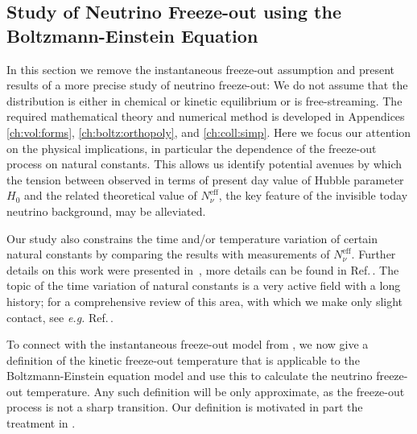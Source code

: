 \subsection{Study of Neutrino Freeze-out using the Boltzmann-Einstein Equation}\label{ch:param:studies}
In this section we remove the instantaneous freeze-out assumption and present results of a more precise study of neutrino freeze-out: We do not assume that the distribution is either in chemical or kinetic equilibrium or is free-streaming. The required mathematical theory and numerical method is developed in Appendices \ref{ch:vol:forms}, \ref{ch:boltz:orthopoly}, and \ref{ch:coll:simp}. Here we focus our attention on the physical implications, in particular the dependence of the freeze-out process on natural constants. This allows us identify potential avenues by which the tension between observed in terms of present day value of Hubble parameter $H_0$ and the related theoretical value of $N^{\mathrm{eff}}_\nu$, the key feature of the invisible today neutrino background, may be alleviated. 

Our study also constrains the time and/or temperature variation of certain natural constants by comparing the results with measurements of $N_\nu^{\mathrm{eff}}$. Further details on this work were presented in~,  more details can be found in Ref.\,\cite{Birrell:2014uka}. The topic of the time variation of natural constants is a very active field with a long history; for a comprehensive review of this area, with which we make only slight contact, see {\it e.g.\/} Ref.\,\cite{Uzan:2010pm}. 

To connect with the instantaneous freeze-out model from , we now give a definition of the kinetic freeze-out temperature that is applicable to the Boltzmann-Einstein equation model and use this to calculate the neutrino freeze-out temperature. Any such definition will be only approximate, as the freeze-out process is not a sharp transition. Our definition is motivated in part the treatment in \cite{Kolb:1990vq}. 

